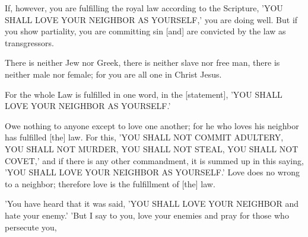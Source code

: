 \vspace{2\baselineskip}

\begin{scripture}[James 2:8-9]
    If, however, you are fulfilling the royal law according to the Scripture, 'YOU SHALL LOVE YOUR NEIGHBOR AS YOURSELF,' you are doing well.
    But if you show partiality, you are committing sin [and] are convicted by the law as transgressors.
\end{scripture}

\vspace{2\baselineskip}

\begin{scripture}[Galatians 3:28]
    There is neither Jew nor Greek, there is neither slave nor free man, there is neither male nor female; for you are all one in Christ Jesus.
\end{scripture}

\vspace{2\baselineskip}

\begin{scripture}[Galatians 5:14]
    For the whole Law is fulfilled in one word, in the [statement], 'YOU SHALL LOVE YOUR NEIGHBOR AS YOURSELF.'
\end{scripture}

\vspace{2\baselineskip}

\begin{scripture}[Romans 13:8-10]
    Owe nothing to anyone except to love one another; for he who loves his neighbor has fulfilled [the] law.
    For this, 'YOU SHALL NOT COMMIT ADULTERY, YOU SHALL NOT MURDER, YOU SHALL NOT STEAL, YOU SHALL NOT COVET,' and if there is any other commandment, it is summed up in this saying, 'YOU SHALL LOVE YOUR NEIGHBOR AS YOURSELF.'
    Love does no wrong to a neighbor; therefore love is the fulfillment of [the] law.
\end{scripture}

\vspace{2\baselineskip}

\begin{scripture}[Matthew 5:43-44]
    'You have heard that it was said, 'YOU SHALL LOVE YOUR NEIGHBOR and hate your enemy.'
    'But I say to you, love your enemies and pray for those who persecute you,
\end{scripture}

